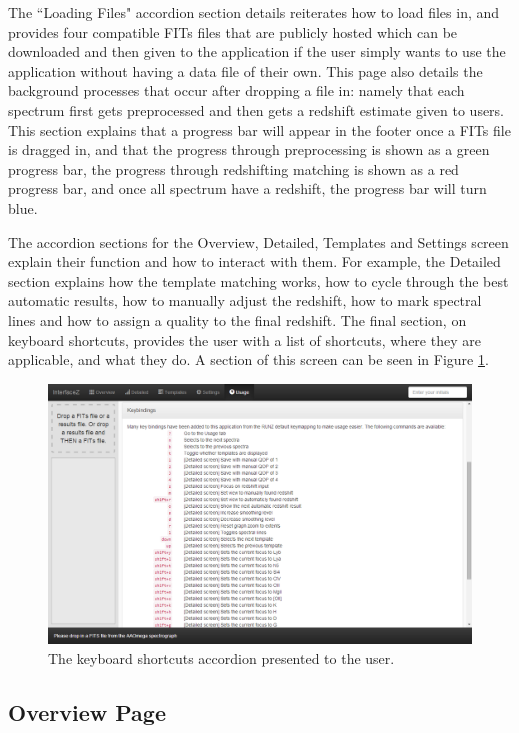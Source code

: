 \documentclass[titlesmallcaps, examinerscopy, copyrightpage]{uqthesis}
\begin{document}
The ``Loading Files" accordion section details reiterates how to load files in, and provides four compatible FITs files that are publicly hosted which can be downloaded and then given to the application if the user simply wants to use the application without having a data file of their own. This page also details the background processes that occur after dropping a file in: namely that each spectrum first gets preprocessed and then gets a redshift estimate given to users. This section explains that a progress bar will appear in the footer once a FITs file is dragged in, and that the progress through preprocessing is shown as a green progress bar, the progress through redshifting matching is shown as a red progress bar, and once all spectrum have a redshift, the progress bar will turn blue.


The accordion sections for the Overview, Detailed, Templates and Settings screen explain their function and how to interact with them. For example, the Detailed section explains how the template matching works, how to cycle through the best automatic results, how to manually adjust the redshift, how to mark spectral lines and how to assign a quality to the final redshift. The final section, on keyboard shortcuts, provides the user with a list of shortcuts, where they are applicable, and what they do. A section of this screen can be seen in Figure \ref{fig:keyboard}.

\begin{figure}[ht!]
\includegraphics[width=1\textwidth]{images/keybindings.png} 
\centering
\caption{The keyboard shortcuts accordion presented to the user.}
\label{fig:keyboard}
\end{figure}


\pagebreak
\subsection{Overview Page}
\end{document}
